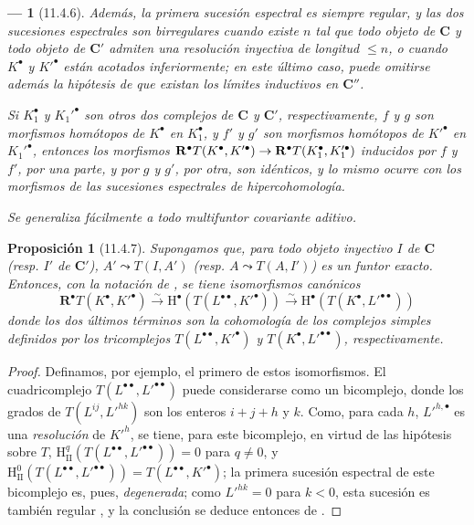 \documentclass[10pt,oneside,openany]{book}
\theoremstyle{egaenv}\newtheorem*{env}{---}
\theoremstyle{egastatement}
\newtheorem*{proposition}{Proposición}
\theoremstyle{egadescription}
\renewcommand{\leq}{\leqslant}
\renewcommand{\to}{\mathchoice{\longrightarrow}{\rightarrow}{\rightarrow}{\rightarrow}}
\begin{document}
\begin{env}[11.4.6]
Además, la primera sucesión espectral es siempre regular, y las dos sucesiones espectrales son birregulares cuando existe $n$ tal que todo objeto de $\boldsymbol{C}$ y todo objeto de $\boldsymbol{C}'$ admiten una resolución inyectiva de longitud $\leq n$, o cuando $K^\bullet$ \emph{y} $K'^\bullet$ están acotados inferiormente;
en este último caso, puede omitirse además la hipótesis de que existan los límites inductivos en $\boldsymbol{C}''$.

Si $K_1^\bullet$ y $K_1'^\bullet$ son otros dos complejos de $\boldsymbol{C}$ y $\boldsymbol{C}'$, respectivamente, $f$ y $g$ son morfismos \emph{homótopos} de $K^\bullet$ en $K_1^\bullet$,
y $f'$ y $g'$ son morfismos \emph{homótopos} de $K'^\bullet$ en $K_1'^\bullet$, entonces los morfismos $\mathbf R^\bullet T(K^\bullet,K'^\bullet)\to
\mathbf R^\bullet T(K_1^\bullet,K_1'^\bullet)$ inducidos por $f$ y $f'$, por una parte, y por $g$ y $g'$, por otra, son idénticos, y lo mismo ocurre con los morfismos de las sucesiones espectrales de hipercohomología.

Se generaliza fácilmente a todo multifuntor covariante aditivo.
\end{env}

\begin{proposition}[11.4.7]
\label{0.11.4.7}
\label{0.11.4.7-fr}
Supongamos que, para todo objeto inyectivo $I$ de $\boldsymbol{C}$ \textup{(resp.} $I'$ de $\boldsymbol{C}'$), $A'\leadsto T(I,A')$ \textup{(resp.} $A\leadsto T(A,I')$) es un funtor exacto.
Entonces, con la notación de \textup{}, se tiene isomorfismos canónicos
\[
  \label{0.11.4.7.1-fr}
  \mathbf R^\bullet T(K^\bullet,K'^\bullet)
  \xrightarrow{\sim}\mathrm H^\bullet(T(L^{\bullet\bullet},K'^\bullet))
  \xrightarrow{\sim}\mathrm H^\bullet(T(K^\bullet,L'^{\bullet\bullet}))
  \tag{11.4.7.1}
\]
donde los dos últimos términos son la cohomología de los complejos simples definidos por los tricomplejos $T(L^{\bullet\bullet},K'^\bullet)$ y $T(K^\bullet,L'^{\bullet\bullet})$, respectivamente.
\end{proposition}

\begin{proof}
Definamos, por ejemplo, el primero de estos isomorfismos.
El cuadricomplejo $T(L^{\bullet\bullet},L'^{\bullet\bullet})$ puede considerarse como un bicomplejo, donde los grados de $T(L^{ij},L'^{hk})$ son los enteros $i+j+h$ y $k$.
Como, para cada $h$, $L'^{h,\bullet}$ es una \emph{resolución} de $K'^h$, se tiene, para este bicomplejo, en virtud de las hipótesis sobre $T$, $\mathrm H_{\mathrm{II}}^q(T(L^{\bullet\bullet},L'^{\bullet\bullet}))=0$ para $q\neq0$, y $\mathrm H_{\mathrm{II}}^0(T(L^{\bullet\bullet},L'^{\bullet\bullet}))
=T(L^{\bullet\bullet},K'^\bullet)$;
la primera sucesión espectral de este bicomplejo es, pues, \emph{degenerada};
como $L'^{hk}=0$ para $k<0$, esta sucesión es también regular , y la conclusión se deduce entonces de .
\end{proof}
\end{document}
